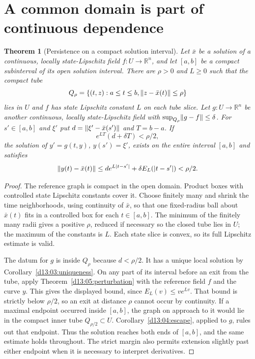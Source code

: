 \documentclass[11pt,oneside]{book}
\newtheorem{theorem}{Theorem}[chapter]
\theoremstyle{definition}
\theoremstyle{remark}\newtheorem{remark}[theorem]{Remark}
\newcommand{\R}{\mathbb R}\newcommand{\C}{\mathbb C}
\begin{document}
\section{A common domain is part of continuous dependence}
\begin{theorem}[Persistence on a compact solution interval]\label{d13:05:common-interval}
Let $\bar x$ be a solution of a continuous, locally state-Lipschitz
field $f:U\to\R^n$, and let $[a,b]$ be a compact subinterval of its
open solution interval. There are $\rho>0$ and $L\geq0$ such that
the compact tube
\[
 Q_\rho=\{(t,z):a\leq t\leq b,
                 \lVert z-\bar x(t)\rVert\leq\rho\}
\]
lies in $U$ and $f$ has state Lipschitz constant $L$ on each tube
slice. Let $g:U\to\R^n$ be another continuous, locally state-Lipschitz
field with $\sup_{Q_\rho}\lVert g-f\rVert\leq\delta$. For $s'\in[a,b]$
and $\xi'$ put $d=\lVert\xi'-\bar x(s')\rVert$ and $T=b-a$. If
\[
 e^{LT}(d+\delta T)<\rho/2,
\]
the solution of $y'=g(t,y)$, $y(s')=\xi'$, exists on the entire
interval $[a,b]$ and satisfies
\[
 \lVert y(t)-\bar x(t)\rVert
 \leq de^{L|t-s'|}+\delta E_L(|t-s'|)<\rho/2.
\]
\end{theorem}
\begin{proof}
The reference graph is compact in the open domain. Product boxes with
controlled state Lipschitz constants cover it. Choose finitely many
and shrink the time neighborhoods, using continuity of $\bar x$, so
that one fixed-radius ball about $\bar x(t)$ fits in a controlled box
for each $t\in[a,b]$. The minimum of the finitely many radii gives a
positive $\rho$, reduced if necessary so the closed tube lies in $U$;
the maximum of the constants is $L$. Each state slice is convex, so
its full Lipschitz estimate is valid.

The datum for $g$ is inside $Q_\rho$ because $d<\rho/2$. It has a
unique local solution by Corollary~\ref{d13:03:uniqueness}. On any
part of its interval before an exit from the tube, apply
Theorem~\ref{d13:05:perturbation} with the reference field $f$ and
the curve $y$. This gives the displayed bound, since
$E_L(v)\leq ve^{Lv}$. That bound is strictly below $\rho/2$, so an
exit at distance $\rho$ cannot occur by continuity. If a maximal
endpoint occurred inside $[a,b]$, the graph on approach to it would
lie in the compact inner tube $Q_{\rho/2}\subset U$.
Corollary~\ref{d13:04:escape}, applied to $g$, rules out that endpoint.
Thus the solution reaches both ends of $[a,b]$, and the same estimate
holds throughout. The strict margin also permits extension slightly
past either endpoint when it is necessary to interpret derivatives.
\end{proof}
\end{document}

